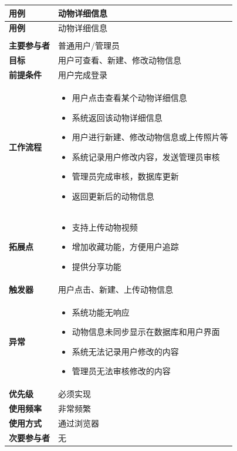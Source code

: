 \documentclass[12pt,a4paper,UTF8]{article}
\begin{document}
\begin{xltabular}{\linewidth}{|>{\raggedright\arraybackslash}p{3cm}|>{\raggedright\arraybackslash}p{8cm}|}
  \hline
  \textbf{用例} & 动物详细信息 \\ \hline \endfirsthead
  \hline
  \textbf{用例} & 动物详细信息 \\ \hline \endhead
  \hline
   \\ \endfoot
  \hline \endlastfoot

  \textbf{主要参与者} & 普通用户/管理员 \\ \hline
  \textbf{目标} & 用户可查看、新建、修改动物信息 \\ \hline
  \textbf{前提条件} & 用户完成登录 \\ \hline
  \textbf{工作流程} & 
  \vspace{-0.5em}
  \begin{itemize}[topsep=0pt, partopsep=0pt, left=0pt, nosep]
      \item 用户点击查看某个动物详细信息
      \item 系统返回该动物详细信息
      \item 用户进行新建、修改动物信息或上传照片等
      \item 系统记录用户修改内容，发送管理员审核
      \item 管理员完成审核，数据库更新
      \item 返回更新后的动物信息
  \end{itemize} \\ \hline
  \textbf{拓展点} &
  \vspace{-0.5em}
  \begin{itemize}[topsep=0pt, partopsep=0pt, left=0pt, nosep]
      \item 支持上传动物视频
      \item 增加收藏功能，方便用户追踪
      \item 提供分享功能
  \end{itemize} \\ \hline
  \textbf{触发器} & 用户点击、新建、上传动物信息 \\ \hline
  \textbf{异常} & 
  \vspace{-0.5em}
  \begin{itemize}[topsep=0pt, partopsep=0pt, left=0pt, nosep]
      \item 系统功能无响应
      \item 动物信息未同步显示在数据库和用户界面
      \item 系统无法记录用户修改的内容
      \item 管理员无法审核修改的内容
  \end{itemize} \\ \hline
  \textbf{优先级} & 必须实现 \\ \hline
  \textbf{使用频率} & 非常频繁 \\ \hline
  \textbf{使用方式} & 通过浏览器 \\ \hline
  \textbf{次要参与者} & 无 \\ \hline
\end{xltabular}
\end{document}

